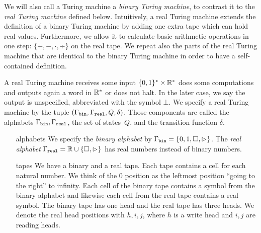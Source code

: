 \documentclass{article}
\begin{document}
We will also call a Turing machine a \textit{binary Turing machine}, to contrast it to the \textit{real Turing machine} defined below.
Intuitively, a real Turing machine extends the definition of a binary Turing machine by 
adding one extra tape which can hold real values.
Furthermore, we allow it to calculate basic arithmetic operations in one step: $\{ +, -, \cdot, \div \}$ on the real tape.
We repeat also the parts of the real Turing machine that are identical to the binary Turing machine in order to have a self-contained definition.

\begin{definition}
\label{def:RealTuringMachine}
    A real Turing machine receives some input $\{0,1\}^*\times \mathbb{R}^*$ does some computations and 
    outputs again a word in $\mathbb{R}^*$ or does not halt. 
    In the later case, we say the output is unspecified, abbreviated with the symbol $\bot$.
    We specify a real Turing machine by the tuple $(\Gamma_\texttt{bin}, \Gamma_\texttt{real}, Q, \delta)$.
    Those components are called the alphabets $\Gamma_\texttt{bin},\Gamma_\texttt{real}$, the set of states~$Q$, and the transition function $\delta$.
    \begin{itemize}[leftmargin=2cm]
    \item[alphabets] We specify the \textit{binary alphabet} by  $\Gamma_\texttt{bin} = \{0, 1, \square, \rhd \}$.
    The \textit{real alphabet} $\Gamma_\texttt{real} = \mathbb{R} \cup \{ \square, \rhd\}$ has real numbers instead of binary numbers.
    \item[tapes] We have a binary and a real tape.
    Each tape contains a cell for each natural number.
    We think of the $0$ position as the leftmost position ``going to the right'' to infinity.
    Each cell of the binary tape contains a symbol from the binary alphabet and likewise each cell from the real tape contains a real symbol.
    The binary tape has one head and the real tape has three heads.
    We denote the real head positions with $h,i,j$, where $h$ is a write head and $i,j$ are reading heads.


\end{itemize}
\end{definition}
\end{document}

